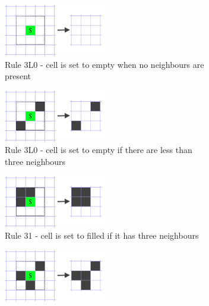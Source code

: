 \documentclass[12pt]{report}
\begin{document}
\begin{figure}[H]
	\centering
	\begin{subfigure}[t]{0.4\textwidth}
		\centering
		\includegraphics[width=0.5\textwidth]{images/rule0dead}
		\caption{Rule 3L0 - cell is set to empty when no neighbours are present} 
	\end{subfigure} \hspace{1em}
	\hfill
	\begin{subfigure}[t]{0.4\textwidth}
		\centering
		\includegraphics[width=0.5\textwidth]{images/rule2dead}
		\caption{Rule 3L0 - cell is set to empty if there are less than three neighbours} 
	\end{subfigure} \hspace{1em} 
	\hfill
	\begin{subfigure}[t]{0.4\textwidth}
		\centering
		\includegraphics[width=0.5\textwidth]{images/rule3alive}
		\caption{Rule 31 - cell is set to filled if it has three neighbours} 
	\end{subfigure} \hspace{1em} 
	\hfill
	\begin{subfigure}[t]{0.4\textwidth}
		\centering
		\includegraphics[width=0.5\textwidth]{images/rule3alive2}

\end{subfigure}
\end{figure}
\end{document}
